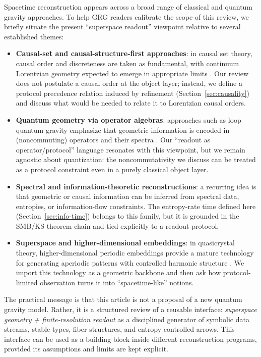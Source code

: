 Spacetime reconstruction appears across a broad range of classical and quantum gravity approaches. To help GRG readers calibrate the scope of this review, we briefly situate the present ``superspace readout'' viewpoint relative to several established themes:
\begin{itemize}[leftmargin=*,itemsep=2pt]
  \item \textbf{Causal-set and causal-structure-first approaches}: in causal set theory, causal order and discreteness are taken as fundamental, with continuum Lorentzian geometry expected to emerge in appropriate limits \cite{Bombelli1987,Sorkin2003}. Our review does not postulate a causal order at the object layer; instead, we define a protocol precedence relation induced by refinement (Section~\ref{sec:causality}) and discuss what would be needed to relate it to Lorentzian causal orders.
  \item \textbf{Quantum geometry via operator algebras}: approaches such as loop quantum gravity emphasize that geometric information is encoded in (noncommuting) operators and their spectra \cite{AshtekarLewandowski2004,Thiemann2007}. Our ``readout as operator/protocol'' language resonates with this viewpoint, but we remain agnostic about quantization: the noncommutativity we discuss can be treated as a protocol constraint even in a purely classical object layer.
  \item \textbf{Spectral and information-theoretic reconstructions}: a recurring idea is that geometric or causal information can be inferred from spectral data, entropies, or information-flow constraints. The entropy-rate time defined here (Section~\ref{sec:info-time}) belongs to this family, but it is grounded in the SMB/KS theorem chain and tied explicitly to a readout protocol.
  \item \textbf{Superspace and higher-dimensional embeddings}: in quasicrystal theory, higher-dimensional periodic embeddings provide a mature technology for generating aperiodic patterns with controlled harmonic structure \cite{BaakeGrimm2013}. We import this technology as a geometric backbone and then ask how protocol-limited observation turns it into ``spacetime-like'' notions.
\end{itemize}

The practical message is that this article is not a proposal of a new quantum gravity model. Rather, it is a structured review of a reusable interface: \emph{superspace geometry + finite-resolution readout} as a disciplined generator of symbolic data streams, stable types, fiber structures, and entropy-controlled arrows. This interface can be used as a building block inside different reconstruction programs, provided its assumptions and limits are kept explicit.

